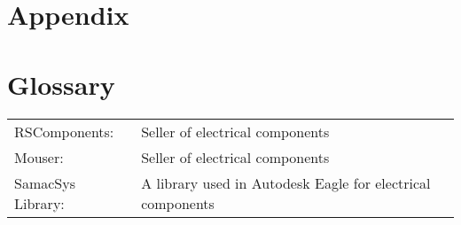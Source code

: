 \documentclass[12pt]{article}
\begin{document}
\tableofcontents




\newpage










\newpage
\section*{Appendix}

\vspace{3cm}

\newpage
\section*{Glossary}

\begin{table}[H]
\begin{tabular}{ l l }
  RSComponents: & Seller of electrical components \\
  Mouser:       & Seller of electrical components \\
  SamacSys Library:     & A library used in Autodesk Eagle for electrical components \\
\end{tabular}
\end{table}
\vspace{3cm}




\end{document}
